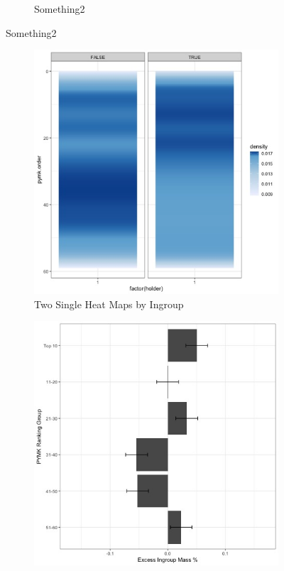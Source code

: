 \documentclass[12pt,letterpaper]{article}
\begin{document}
\begin{figure}[ht]
\begin{subfigure}{.5\textwidth}
        \caption{Something2}
        \label{fig:nf_rankingboost_india}
    \end{subfigure}
\end{figure}

\begin{figure}[ht]
\caption{PYMK Ingroup Posts Not Higher}
\label{fig:pymk_bygroup}
    \begin{subfigure}{.5\textwidth} 
        \centering
        \includegraphics[width=1\linewidth]{Output/Graphs/Audit/Heatmaps/India PYMK pymk rank by ingroup - smooth.jpg}  
        \caption{Two Single Heat Maps by Ingroup}
        \label{fig:pymk_bygroup_hm_india}
        \end{subfigure}
    \begin{subfigure}{.5\textwidth}
        \centering
        \includegraphics[width=.9\linewidth]{Output/Graphs/Audit/Excess Mass/India PYMK excess mass by ranking group.jpg}  

\end{subfigure}
\end{figure}
\end{document}
